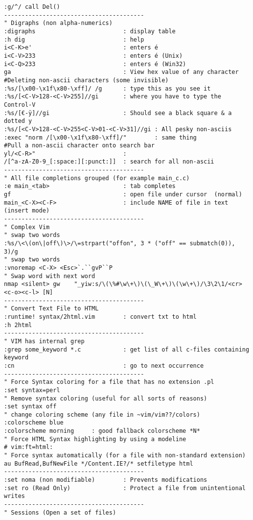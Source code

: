 \documentclass[10pt,landscape]{article}
\begin{document}
\begin{multicols}{2}
\begin{verbatim}
:g/^/ call Del()
----------------------------------------
" Digraphs (non alpha-numerics)
:digraphs                         : display table
:h dig                            : help
i<C-K>e'                          : enters é
i<C-V>233                         : enters é (Unix)
i<C-Q>233                         : enters é (Win32)
ga                                : View hex value of any character
#Deleting non-ascii characters (some invisible)
:%s/[\x00-\x1f\x80-\xff]/ /g      : type this as you see it
:%s/[<C-V>128-<C-V>255]//gi       : where you have to type the Control-V
:%s/[€-ÿ]//gi                     : Should see a black square & a dotted y
:%s/[<C-V>128-<C-V>255<C-V>01-<C-V>31]//gi : All pesky non-asciis
:exec "norm /[\x00-\x1f\x80-\xff]/"        : same thing
#Pull a non-ascii character onto search bar
yl/<C-R>"                         :
/[^a-zA-Z0-9_[:space:][:punct:]]  : search for all non-ascii
----------------------------------------
" All file completions grouped (for example main_c.c)
:e main_<tab>                     : tab completes
gf                                : open file under cursor  (normal)
main_<C-X><C-F>                   : include NAME of file in text (insert mode)
----------------------------------------
" Complex Vim
" swap two words
:%s/\<\(on\|off\)\>/\=strpart("offon", 3 * ("off" == submatch(0)), 3)/g
" swap two words
:vnoremap <C-X> <Esc>`.``gvP``P
" Swap word with next word
nmap <silent> gw    "_yiw:s/\(\%#\w\+\)\(\_W\+\)\(\w\+\)/\3\2\1/<cr><c-o><c-l> [N]
----------------------------------------
" Convert Text File to HTML
:runtime! syntax/2html.vim        : convert txt to html
:h 2html
----------------------------------------
" VIM has internal grep
:grep some_keyword *.c            : get list of all c-files containing keyword
:cn                               : go to next occurrence
----------------------------------------
" Force Syntax coloring for a file that has no extension .pl
:set syntax=perl
" Remove syntax coloring (useful for all sorts of reasons)
:set syntax off
" change coloring scheme (any file in ~vim/vim??/colors)
:colorscheme blue
:colorscheme morning     : good fallback colorscheme *N*
" Force HTML Syntax highlighting by using a modeline
# vim:ft=html:
" Force syntax automatically (for a file with non-standard extension)
au BufRead,BufNewFile */Content.IE?/* setfiletype html
----------------------------------------
:set noma (non modifiable)        : Prevents modifications
:set ro (Read Only)               : Protect a file from unintentional writes
----------------------------------------
" Sessions (Open a set of files)

\end{verbatim}
\end{multicols}
\end{document}
